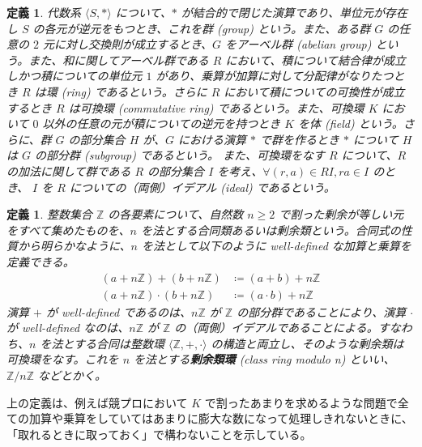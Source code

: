 \documentclass[12pt, a4j]{ltjsarticle}
\newtheorem{defi}[thm]{定義}
\begin{document}
\begin{defi}
代数系 $\langle S, * \rangle$ について、$*$ が結合的で閉じた演算であり、単位元が存在し $S$ の各元が逆元をもつとき、これを群 (group) という。また、ある群 $G$ の任意の $2$ 元に対し交換則が成立するとき、$G$ をアーベル群 (abelian group) という。また、和に関してアーベル群である $R$ において、積について結合律が成立しかつ積についての単位元 $1$ があり、乗算が加算に対して分配律がなりたつとき $R$ は環 (ring) であるという。さらに $R$ において積についての可換性が成立するとき $R$ は可換環 (commutative ring) であるという。また、可換環 $K$ において $0$ 以外の任意の元が積についての逆元を持つとき $K$ を体 (field) という。さらに、群 $G$ の部分集合 $H$ が、$G$ における演算 $*$ で群を作るとき $*$ について $H$ は $G$ の部分群 (subgroup) であるという。
また、可換環をなす $R$ について、$R$ の加法に関して群である $R$ の部分集合 $I$ を考え、$\forall (r,a)\in RI, ra\in I$ のとき、 $I$ を $R$ についての（両側）イデアル (ideal) であるという。
\end{defi}

\vspace{1cm}

\begin{defi}
整数集合 $\mathbb{Z}$ の各要素について、自然数 $n\ge2$ で割った剰余が等しい元をすべて集めたものを、$n$ を法とする合同類あるいは剰余類という。合同式の性質から明らかなように、$n$ を法として以下のように well-defined な加算と乗算を定義できる。
\begin{align}
(a+n\mathbb{Z}) + (b+n\mathbb{Z}) &\coloneqq (a+b)+n\mathbb{Z} \\
(a+n\mathbb{Z})\cdot(b+n\mathbb{Z}) &\coloneqq (a\cdot b)+n\mathbb{Z}
\end{align}
演算 $+$ が well-defined であるのは、$n\mathbb{Z}$ が $\mathbb{Z}$ の部分群であることにより、演算 $\cdot$ が
well-defined なのは、$n\mathbb{Z}$ が $\mathbb{Z}$ の（両側）イデアルであることによる。すなわち、$n$ を法とする合同は整数環 $\langle \mathbb{Z}, +, \cdot \rangle$ の構造と両立し、そのような剰余類は可換環をなす。これを $n$ を法とする{\bf 剰余類環} (class ring modulo n) といい、$\mathbb{Z}/n\mathbb{Z}$ などとかく。
\end{defi}

上の定義は、例えば競プロにおいて $K$ で割ったあまりを求めるような問題で全ての加算や乗算をしていてはあまりに膨大な数になって処理しきれないときに、「取れるときに取っておく」で構わないことを示している。
\end{document}
